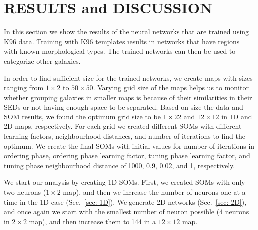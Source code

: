 \section{RESULTS and DISCUSSION}
\label{sec: result}

    In this section we show the results of the neural networks that are trained using K96 data.
    Training with K96 templates results in networks that have regions with known morphological types. 
    The trained networks can then be used to categorize other galaxies.
    
    In order to find sufficient size for the trained networks, we create maps with sizes ranging from $1\times2$ to $50\times50$.
    Varying grid size of the maps helps us to monitor whether grouping galaxies in smaller maps is because of their similarities in their SEDs or not having enough space to be separated. %
    Based on size the data and SOM results, we found the optimum grid size to be $1\times22$ and $12\times12$ in 1D and 2D maps, respectively. 
    For each grid we created different SOMs with different learning factors, neighbourhood distances, and number of iterations to find the optimum.
    We create the final SOMs with initial values for number of iterations in ordering phase, ordering phase learning factor, tuning phase learning factor, and tuning phase neighbourhood distance of 1000, 0.9, 0.02, and 1, respectively.
   
    We start our analysis by creating 1D SOMs. 
    First, we created SOMs with only two neurons ($1\times2$ map), and then we increase the number of neurons one at a time in the 1D case (Sec.~\ref{sec: 1D}).
    We generate 2D networks (Sec.~\ref{sec: 2D}), and once again we start with the smallest number of neuron possible (4 neurons in $2\times2$ map), and then increase them to 144 in a $12\times12$ map.
    
